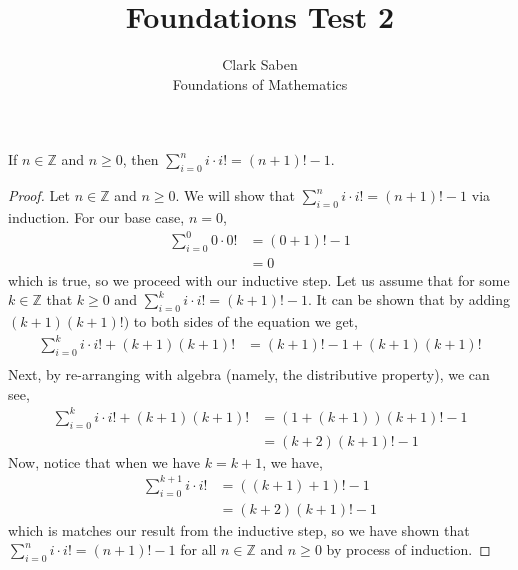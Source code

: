 \documentclass[12pt]{article}
\newenvironment{theorem}[2][Theorem]{\begin{trivlist}
\item[\hskip \labelsep {\bfseries #1}\hskip \labelsep {\bfseries #2.}]}{\end{trivlist}}
\begin{document}
 
 
\title{Foundations Test 2}%
\author{Clark Saben\\ %
Foundations of Mathematics} %
 
\maketitle

\section{}
\begin{theorem}1
	If $n \in \mathbb{Z}$ and $n \geq 0$, then $\sum_{i=0}^{n}i\cdot i! = \left(n+1 \right)!-1$.
\end{theorem}
\begin{proof}
    Let $n \in \mathbb{Z}$ and $n \geq 0$. We will show that $\sum_{i=0}^{n}i\cdot i! = \left(n+1 \right)!-1$ via induction. For our base case, $n=0$,
    \begin{align*}
        \sum_{i=0}^{0}0\cdot 0! &= (0+1)!-1\\
	&= 0
    \end{align*}
    which is true, so we proceed with our inductive step. Let us assume that for some $k \in \mathbb{Z}$ 
    that $k \geq 0$ and $\sum_{i=0}^{k}i\cdot i! = \left(k+1 \right)!-1$. It can be shown that by adding
    $(k+1)(k+1)!)$ to both sides of the equation we get,
    \begin{align*}
	\sum_{i=0}^{k}i\cdot i! + (k+1)(k+1)! &= \left(k+1 \right)!-1 + (k+1)(k+1)!\\
    \end{align*}
    Next, by re-arranging with algebra (namely, the distributive property), we can see,
    \begin{align*}
		\sum_{i=0}^{k}i\cdot i! + (k+1)(k+1)! &= (1+(k+1))(k+1)!-1\\
						      &= (k+2)(k+1)!-1
\end{align*}
Now, notice that when we have $k=k+1$, we have,
\begin{align*}
	\sum_{i=0}^{k+1}i\cdot i! &= ((k+1)+1)!-1\\
	&= (k+2)(k+1)!-1
\end{align*}
which is matches our result from the inductive step, so we have shown that\\ $\sum_{i=0}^{n}i\cdot i! = \left(n+1 \right)!-1$ for all $n \in \mathbb{Z}$ and $n \geq 0$
by process of induction.
\end{proof}
\end{document}
